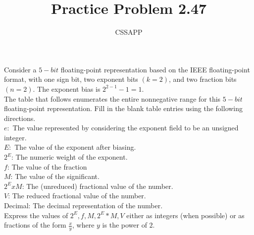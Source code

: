 \documentclass{article}
\title{Practice Problem 2.47}
\author{CSSAPP}
\begin{document}
    \maketitle

    \begin{flushleft}
        Consider a $5-bit$ floating-point representation based on the IEEE 
        floating-point format, with one sign bit, two exponent bits $(k = 2)$, 
        and two fraction bits $(n = 2)$. The exponent bias is $2^{2-1} -1 = 1$.\\
        The table that follows enumerates the entire nonnegative range for this $5-bit$
        floating-point representation. Fill in the blank table entries using the following 
        directions.\\ 
        $e:$        The value represented by considering the exponent field to be an unsigned integer.\\
        $E:$        The value of the exponent after biasing.\\
        $2^E$:      The numeric weight of the exponent.\\
        $f$:        The value of  the fraction\\
        $M$:        The value of the significant.\\
        $2^E x M$:  The (unreduced) fractional value of the number.\\
        $V$:        The reduced fractional value of the number.\\
        Decimal:    The decimal representation of the number.\\
        \smallbreak
        Express the values of $2^E, f, M, 2^E \ast M, V$ either as integers (when possible) or 
        as fractions of the form $\frac{x}{y}$, where $y$ is the power of $2$. \\


\end{flushleft}
\end{document}
